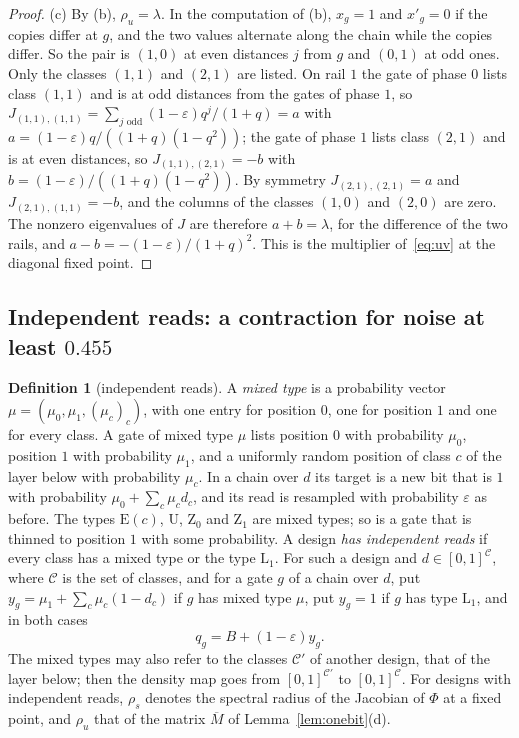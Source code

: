 \documentclass[11pt]{amsart}
\theoremstyle{definition}
\newtheorem{definition}[theorem]{Definition}
\theoremstyle{remark}
\newcommand{\eps}{\varepsilon}
\begin{document}
\begin{proof}
(c) By (b), $\rho_u=\lambda$. In the computation of (b), $x_g=1$ and $x'_g=0$ if the copies
differ at $g$, and the two values alternate along the chain while the copies differ. So the pair
is $(1,0)$ at even distances $j$ from $g$ and $(0,1)$ at odd ones. Only the classes $(1,1)$ and
$(2,1)$ are listed. On rail $1$ the gate of phase $0$ lists class $(1,1)$ and is at odd distances
from the gates of phase $1$, so
$J_{(1,1),(1,1)}=\sum_{j\text{ odd}}(1-\eps)q^j/(1+q)=a$ with $a=(1-\eps)q/((1+q)(1-q^2))$; the
gate of phase $1$ lists class $(2,1)$ and is at even distances, so $J_{(1,1),(2,1)}=-b$ with
$b=(1-\eps)/((1+q)(1-q^2))$. By symmetry $J_{(2,1),(2,1)}=a$ and $J_{(2,1),(1,1)}=-b$, and the
columns of the classes $(1,0)$ and $(2,0)$ are zero. The nonzero eigenvalues of $J$ are therefore
$a+b=\lambda$, for the difference of the two rails, and $a-b=-(1-\eps)/(1+q)^2$. This is the
multiplier of~\eqref{eq:uv} at the diagonal fixed point.
\end{proof}

\subsection{Independent reads: a contraction for noise at least \texorpdfstring{$0.455$}{0.455}}\label{sec:indep}

\begin{definition}[independent reads]\label{def:indep}
A \emph{mixed type} is a probability vector $\mu=(\mu_0,\mu_1,(\mu_c)_c)$, with one entry for
position $0$, one for position $1$ and one for every class. A gate of mixed type $\mu$ lists
position $0$ with probability $\mu_0$, position $1$ with probability $\mu_1$, and a uniformly
random position of class $c$ of the layer below with probability $\mu_c$. In a chain over $d$ its
target is a new bit that is $1$ with probability $\mu_0+\sum_c\mu_cd_c$, and its read is resampled
with probability $\eps$ as before. The types $\mathrm E(c)$, $\mathrm U$, $\mathrm Z_0$ and
$\mathrm Z_1$ are mixed types; so is a gate that is thinned to position $1$ with some
probability. A design \emph{has independent reads} if every class has a mixed type or the type
$\mathrm L_1$. For such a design and $d\in[0,1]^{\mathcal C}$, where $\mathcal C$ is the set of
classes, and for a gate $g$ of a chain over $d$, put $y_g=\mu_1+\sum_c\mu_c(1-d_c)$ if $g$ has
mixed type $\mu$, put $y_g=1$ if $g$ has type $\mathrm L_1$, and in both cases
\[
q_g=B+(1-\eps)y_g .
\]
The mixed types may also refer to the classes $\mathcal C'$ of another design, that of the layer
below; then the density map goes from $[0,1]^{\mathcal C'}$ to $[0,1]^{\mathcal C}$. For designs with
independent reads, $\rho_s$ denotes the spectral radius of the Jacobian of $\Phi$ at a fixed point,
and $\rho_u$ that of the matrix $\overline M$ of Lemma~\ref{lem:onebit}(d).
\end{definition}
\end{document}
